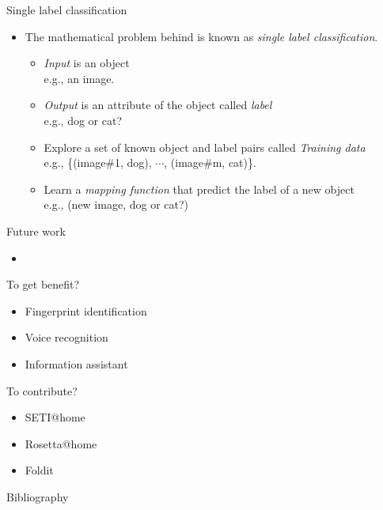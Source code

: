 \documentclass[first=dgreen,second=purple,logo=yellowexc]{aaltoslides}
\begin{document}
{\begin{frame}{Single label classification}
	\begin{itemize}
		\item The mathematical problem behind is known as \textit{\color{aaltoblue} single label classification}.
		\begin{itemize}
			\footnotesize
			\item \textit{\color{aaltoblue} Input} is an object\\
			e.g., an image.
			\item \textit{\color{aaltoblue} Output} is an attribute of the object called \textit{\color{aaltoblue} label}\\
			e.g., dog or cat?
			\item Explore a set of known object and label pairs called \textit{\color{aaltoblue} Training data} \\
			e.g., \{(image\#1, dog), $\cdots$, (image\#m, cat)\}.
			\item Learn a \textit{\color{aaltoblue}mapping function} that predict the label of a new object\\
			e.g., (new image, dog or cat?)
		\end{itemize}
	\end{itemize}
\end{frame}



\begin{frame}{Future work}
	\begin{itemize}
		\item 
	\end{itemize}
\end{frame}


\begin{frame}{To get benefit?}
	\begin{itemize}
		\item Fingerprint identification
		\item Voice recognition
		\item Information assistant
	\end{itemize}
\end{frame}


\begin{frame}{To contribute?}
	\begin{itemize}
		\item SETI@home
		\item Rosetta@home
		\item Foldit
	\end{itemize}
\end{frame}










\begin{frame}[allowframebreaks]{Bibliography}
%

 
\end{frame}

}
\end{document}
